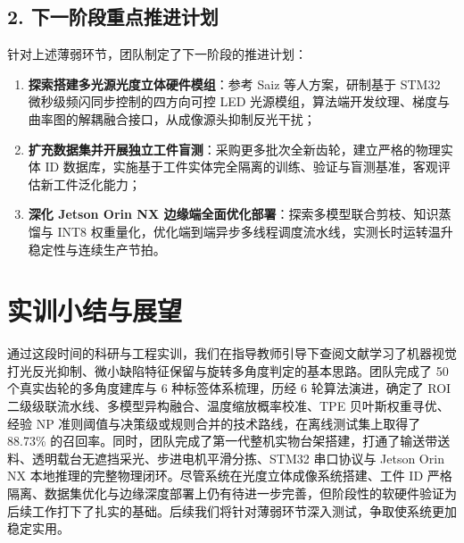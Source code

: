 \subsection*{2. 下一阶段重点推进计划}
针对上述薄弱环节，团队制定了下一阶段的推进计划：
\begin{enumerate}
    \item \textbf{探索搭建多光源光度立体硬件模组}：参考 Saiz 等人方案，研制基于 STM32 微秒级频闪同步控制的四方向可控 LED 光源模组，算法端开发纹理、梯度与曲率图的解耦融合接口，从成像源头抑制反光干扰；
    \item \textbf{扩充数据集并开展独立工件盲测}：采购更多批次全新齿轮，建立严格的物理实体 ID 数据库，实施基于工件实体完全隔离的训练、验证与盲测基准，客观评估新工件泛化能力；
    \item \textbf{深化 Jetson Orin NX 边缘端全面优化部署}：探索多模型联合剪枝、知识蒸馏与 INT8 权重量化，优化端到端异步多线程调度流水线，实测长时运转温升稳定性与连续生产节拍。
\end{enumerate}

\section*{实训小结与展望}

通过这段时间的科研与工程实训，我们在指导教师引导下查阅文献学习了机器视觉打光反光抑制、微小缺陷特征保留与旋转多角度判定的基本思路。团队完成了 50 个真实齿轮的多角度建库与 6 种标签体系梳理，历经 6 轮算法演进，确定了 ROI 二级级联流水线、多模型异构融合、温度缩放概率校准、TPE 贝叶斯权重寻优、经验 NP 准则阈值与决策级或规则合并的技术路线，在离线测试集上取得了 88.73\% 的召回率。同时，团队完成了第一代整机实物台架搭建，打通了输送带送料、透明载台无遮挡采光、步进电机平滑分拣、STM32 串口协议与 Jetson Orin NX 本地推理的完整物理闭环。尽管系统在光度立体成像系统搭建、工件 ID 严格隔离、数据集优化与边缘深度部署上仍有待进一步完善，但阶段性的软硬件验证为后续工作打下了扎实的基础。后续我们将针对薄弱环节深入测试，争取使系统更加稳定实用。
